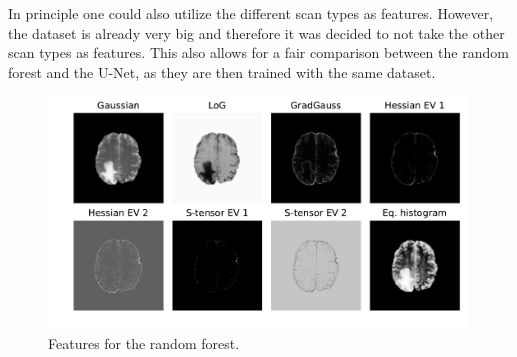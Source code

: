 \documentclass[final]{article}
\begin{document}
In principle one could also utilize the different scan types as features.
However, the dataset is already very big and therefore it was decided to not
take the other scan types as features. This also allows for a fair comparison
between the random forest and the U-Net, as they are then trained with the same
dataset.

\begin{figure}
\centering
\includegraphics[width=0.99\textwidth]{features}
\caption{Features for the random forest. }
\label{fig:features}
\end{figure}


\vspace{0.75in}
\end{document}
